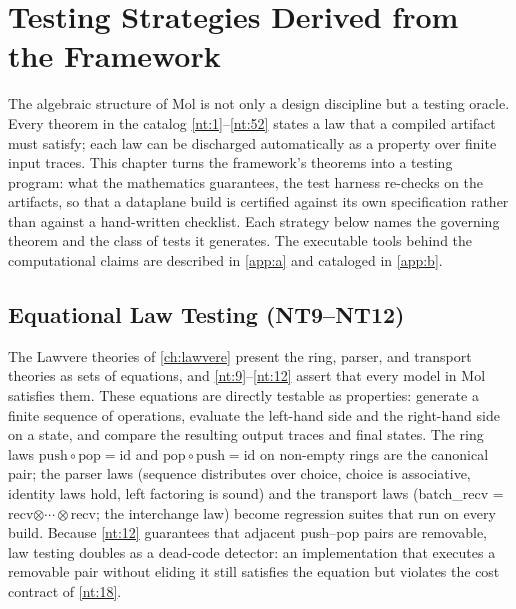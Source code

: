 \chapter{Testing Strategies Derived from the Framework}\label{ch:testing}

The algebraic structure of Mol is not only a design discipline but a testing oracle. Every theorem in the catalog \ref{nt:1}--\ref{nt:52} states a law that a compiled artifact must satisfy; each law can be discharged automatically as a property over finite input traces. This chapter turns the framework's theorems into a testing program: what the mathematics guarantees, the test harness re-checks on the artifacts, so that a dataplane build is certified against its own specification rather than against a hand-written checklist. Each strategy below names the governing theorem and the class of tests it generates. The executable tools behind the computational claims are described in \autoref{app:a} and cataloged in \autoref{app:b}.

\section{Equational Law Testing (NT9--NT12)}
The Lawvere theories of \autoref{ch:lawvere} present the ring, parser, and transport theories as sets of equations, and \ref{nt:9}--\ref{nt:12} assert that every model in Mol satisfies them. These equations are directly testable as properties: generate a finite sequence of operations, evaluate the left-hand side and the right-hand side on a state, and compare the resulting output traces and final states. The ring laws $\mathrm{push}\circ\mathrm{pop} = \mathrm{id}$ and $\mathrm{pop}\circ\mathrm{push} = \mathrm{id}$ on non-empty rings are the canonical pair; the parser laws (sequence distributes over choice, choice is associative, identity laws hold, left factoring is sound) and the transport laws (batch\_recv = recv$\otimes\cdots\otimes$recv; the interchange law) become regression suites that run on every build. Because \ref{nt:12} guarantees that adjacent push--pop pairs are removable, law testing doubles as a dead-code detector: an implementation that executes a removable pair without eliding it still satisfies the equation but violates the cost contract of \ref{nt:18}.

